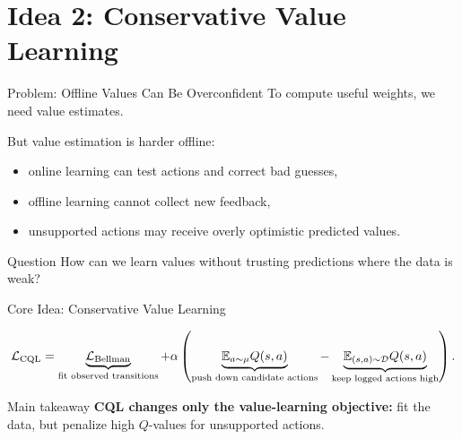 \section{Idea 2: Conservative Value Learning}

\begin{frame}{Problem: Offline Values Can Be Overconfident}
  To compute useful weights, we need value estimates.

  \vspace{0.35cm}
  But value estimation is harder offline:
  \begin{itemize}
    \item online learning can test actions and correct bad guesses,
    \item offline learning cannot collect new feedback,
    \item unsupported actions may receive overly optimistic predicted values.
  \end{itemize}

  \vspace{0.35cm}
  \begin{block}{Question}
    How can we learn values without trusting predictions where the data is weak?
  \end{block}
\end{frame}

\begin{frame}{Core Idea: Conservative Value Learning}
  \centering

  \vspace{0.15cm}
  \[
    \mathcal L_{\rm CQL}
    =
    \underbrace{\mathcal L_{\rm Bellman}}_{\text{fit observed transitions}}
    +
    \alpha
    \left(
      \underbrace{\mathbb E_{a\sim\mu} Q(s,a)}_{\text{push down candidate actions}}
      -
      \underbrace{\mathbb E_{(s,a)\sim\mathcal D} Q(s,a)}_{\text{keep logged actions high}}
    \right).
  \]

  \vspace{0.15cm}
  \begin{block}{Main takeaway}
    \textbf{CQL changes only the value-learning objective:} fit the data, but penalize high $Q$-values for unsupported actions.
  \end{block}
\end{frame}
